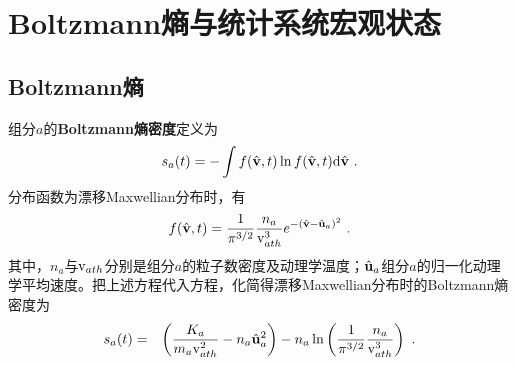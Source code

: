 
\chapter{Boltzmann熵与统计系统宏观状态}
\label{Boltzmann熵与统计系统宏观状态}

  \section{Boltzmann熵}
  \label{Boltzmann熵}

    组分$a$的\textbf{Boltzmann熵密度}定义为
    \begin{eqnarray}
        s_a (t) = - \int f(\hat{\mathbf{v}}, t) \ln f(\hat{\mathbf{v}}, t) \mathrm{d} \hat{\mathbf{v}} ~. \label{sa}
    \end{eqnarray}
    分布函数为漂移Maxwellian分布时，有
    \begin{eqnarray}
        f (\hat{\mathbf{v}}, t) = \frac{1}{\pi ^{3/2}} \frac{n_a}{\mathrm{v}_{ath}^3} e^{-\left (\hat{\mathbf{v}} - \hat{\mathbf{u}}_a \right )^2} ~. \label{fDM}
    \end{eqnarray}
    其中，$n_a$与$\mathrm{v}_{ath}$分别是组分$a$的粒子数密度及动理学温度；$\hat{\mathbf{u}}_a$组分$a$的归一化动理学平均速度。把上述方程代入方程，化简得漂移Maxwellian分布时的Boltzmann熵密度为
    \begin{eqnarray}
        s_a (t) & = & \left (\frac{K_a}{m_a \mathrm{v}_{ath}^2 } - n_a \hat{\mathbf{u}}_a^2 \right ) - n_a \ln \left (\frac{1}{\pi ^{3/2}} \frac{n_a}{\mathrm{v}_{ath}^3} \right )~. \label{safDM}
    \end{eqnarray}

